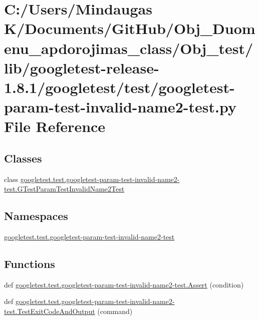 \hypertarget{_obj__test_2lib_2googletest-release-1_88_81_2googletest_2test_2googletest-param-test-invalid-name2-test_8py}{}\section{C\+:/\+Users/\+Mindaugas K/\+Documents/\+Git\+Hub/\+Obj\+\_\+\+Duomenu\+\_\+apdorojimas\+\_\+class/\+Obj\+\_\+test/lib/googletest-\/release-\/1.8.1/googletest/test/googletest-\/param-\/test-\/invalid-\/name2-\/test.py File Reference}
\label{_obj__test_2lib_2googletest-release-1_88_81_2googletest_2test_2googletest-param-test-invalid-name2-test_8py}
\subsection*{Classes}
\begin{DoxyCompactItemize}
\item 
class \mbox{\hyperlink{classgoogletest_1_1test_1_1googletest-param-test-invalid-name2-test_1_1_g_test_param_test_invalid_name2_test}{googletest.\+test.\+googletest-\/param-\/test-\/invalid-\/name2-\/test.\+G\+Test\+Param\+Test\+Invalid\+Name2\+Test}}
\end{DoxyCompactItemize}
\subsection*{Namespaces}
\begin{DoxyCompactItemize}
\item 
 \mbox{\hyperlink{namespacegoogletest_1_1test_1_1googletest-param-test-invalid-name2-test}{googletest.\+test.\+googletest-\/param-\/test-\/invalid-\/name2-\/test}}
\end{DoxyCompactItemize}
\subsection*{Functions}
\begin{DoxyCompactItemize}
\item 
def \mbox{\hyperlink{namespacegoogletest_1_1test_1_1googletest-param-test-invalid-name2-test_a140cf6bca2f100cb1e8802e8f4d45a8c}{googletest.\+test.\+googletest-\/param-\/test-\/invalid-\/name2-\/test.\+Assert}} (condition)
\item 
def \mbox{\hyperlink{namespacegoogletest_1_1test_1_1googletest-param-test-invalid-name2-test_ad8f3b058f74f560dea596b54980287b6}{googletest.\+test.\+googletest-\/param-\/test-\/invalid-\/name2-\/test.\+Test\+Exit\+Code\+And\+Output}} (command)
\end{DoxyCompactItemize}
